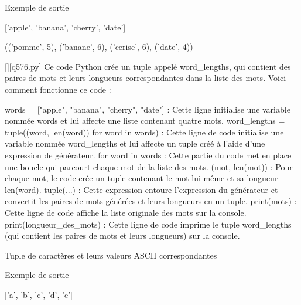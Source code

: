 Exemple de sortie

['apple', 'banana', 'cherry', 'date']

(('pomme', 5), ('banane', 6), ('cerise', 6), ('date', 4))
        \par
        \begin{solution}
            \renewcommand{\nomfichier}{q576.py}
            \pythonfile{\chemincode \nomfichier}[][\nomfichier]
            Ce code Python crée un tuple appelé word\_lengths, qui contient des paires de mots et leurs longueurs correspondantes dans la liste des mots. Voici comment fonctionne ce code :

    words = ["apple", "banana", "cherry", "date"] : Cette ligne initialise une variable nommée words et lui affecte une liste contenant quatre mots.
    word\_lengths = tuple((word, len(word)) for word in words) : Cette ligne de code initialise une variable nommée word\_lengths et lui affecte un tuple créé à l'aide d'une expression de générateur.
        for word in words : Cette partie du code met en place une boucle qui parcourt chaque mot de la liste des mots.
        (mot, len(mot)) : Pour chaque mot, le code crée un tuple contenant le mot lui-même et sa longueur len(word).
        tuple(...) : Cette expression entoure l'expression du générateur et convertit les paires de mots générées et leurs longueurs en un tuple.
    print(mots) : Cette ligne de code affiche la liste originale des mots sur la console.
    print(longueur\_des\_mots) : Cette ligne de code imprime le tuple word\_lengths (qui contient les paires de mots et leurs longueurs) sur la console.
        \end{solution}
        

        \question
        Tuple de caractères et leurs valeurs ASCII correspondantes

Exemple de sortie

['a', 'b', 'c', 'd', 'e']


